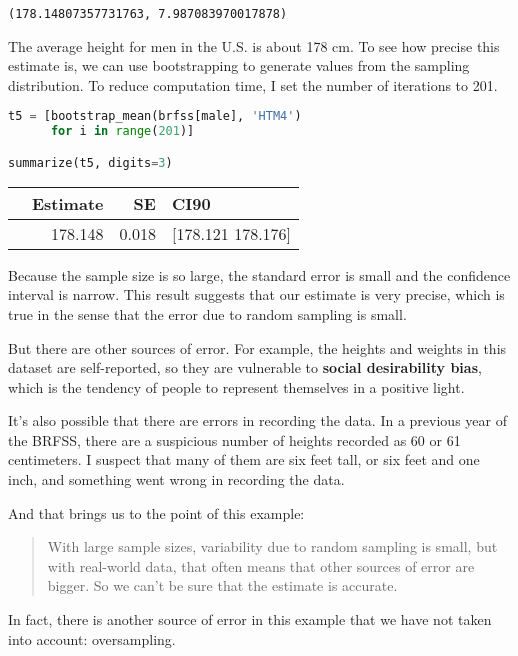 \begin{lstlisting}[style=output]
(178.14807357731763, 7.987083970017878)
\end{lstlisting}

The average height for men in the U.S. is about 178 cm. To see how
precise this estimate is, we can use bootstrapping to generate values
from the sampling distribution. To reduce computation time, I set the
number of iterations to 201.

\begin{lstlisting}[language=Python,style=source]
t5 = [bootstrap_mean(brfss[male], 'HTM4')
      for i in range(201)]

summarize(t5, digits=3)
\end{lstlisting}

\begin{tabular}{lrrl}
\toprule
 & Estimate & SE & CI90 \\
\midrule
 & 178.148 & 0.018 & [178.121 178.176] \\
\bottomrule
\end{tabular}

Because the sample size is so large, the standard error is small and the
confidence interval is narrow. This result suggests that our estimate is
very precise, which is true in the sense that the error due to random
sampling is small.

But there are other sources of error. For example, the heights and
weights in this dataset are self-reported, so they are vulnerable to
\textbf{social desirability bias}, which is the tendency of people to
represent themselves in a positive light.

It's also possible that there are errors in recording the data. In a
previous year of the BRFSS, there are a suspicious number of heights
recorded as 60 or 61 centimeters. I suspect that many of them are six
feet tall, or six feet and one inch, and something went wrong in
recording the data.

And that brings us to the point of this example:

\begin{quote}
With large sample sizes, variability due to random sampling is small,
but with real-world data, that often means that other sources of error
are bigger. So we can't be sure that the estimate is accurate.
\end{quote}

In fact, there is another source of error in this example that we have
not taken into account: oversampling.

